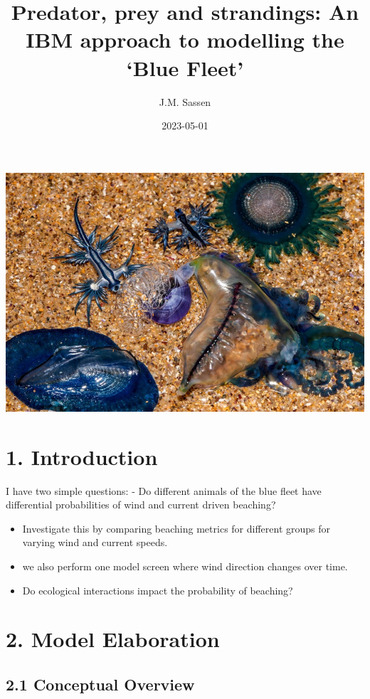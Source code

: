 \documentclass[
]{article}
\title{Predator, prey and strandings: An IBM approach to modelling the
`Blue Fleet'}
\author{J.M. Sassen}
\date{2023-05-01}
\begin{document}
\maketitle

\includegraphics{./Images/BlueFleet_Image_ABC.jpeg}

\hypertarget{introduction}{%
\section{1. Introduction}\label{introduction}}

I have two simple questions: - Do different animals of the blue fleet
have differential probabilities of wind and current driven beaching?

\begin{itemize}
\item
  Investigate this by comparing beaching metrics for different groups
  for varying wind and current speeds.
\item
  we also perform one model screen where wind direction changes over
  time.
\item
  Do ecological interactions impact the probability of beaching?
\end{itemize}

\hypertarget{model-elaboration}{%
\section{2. Model Elaboration}\label{model-elaboration}}

\hypertarget{conceptual-overview}{%
\subsection{2.1 Conceptual Overview}\label{conceptual-overview}}
\end{document}
